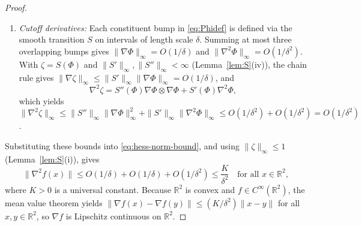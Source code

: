 \documentclass[10pt,a4paper]{amsart}
\newcommand{\R}{\mathbb{R}}
\begin{document}
\begin{proof}
\begin{enumerate}
\item \emph{Cutoff derivatives:}
Each constituent bump in \eqref{eq:Phidef} is defined via the smooth transition $S$ on intervals of length scale $\delta$.
Summing at most three overlapping bumps gives $\|\nabla\Phi\|_\infty = O(1/\delta)$ and $\|\nabla^2\Phi\|_\infty = O(1/\delta^2)$.
With $\zeta = S(\Phi)$ and $\|S'\|_\infty, \|S''\|_\infty < \infty$ (Lemma~\ref{lem:S}(iv)), the chain rule gives $\|\nabla\zeta\|_\infty \le \|S'\|_\infty \|\nabla\Phi\|_\infty = O(1/\delta)$, and
\[
\nabla^2\zeta = S''(\Phi)\nabla\Phi\otimes\nabla\Phi + S'(\Phi)\nabla^2\Phi,
\]
which yields $\|\nabla^2\zeta\|_\infty \le \|S''\|_\infty \|\nabla\Phi\|_\infty^2 + \|S'\|_\infty \|\nabla^2\Phi\|_\infty \le O(1/\delta^2) + O(1/\delta^2) = O(1/\delta^2)$.
\end{enumerate}
Substituting these bounds into \eqref{eq:hess-norm-bound}, and using $\|\zeta\|_\infty \le 1$ (Lemma~\ref{lem:S}(i)), gives
\[
\|\nabla^2 f(x)\| \le O(1/\delta) + O(1/\delta) + O(1/\delta^2) \le \frac{K}{\delta^2} \quad \text{for all } x \in \R^2,
\]
where $K > 0$ is a universal constant.
Because $\R^2$ is convex and $f \in C^\infty(\R^2)$, the mean value theorem yields
$\|\nabla f(x) - \nabla f(y)\| \le (K/\delta^2)\|x-y\|$ for all $x, y \in \R^2$,
so $\nabla f$ is Lipschitz continuous on $\R^2$.
\end{proof}
\end{document}
